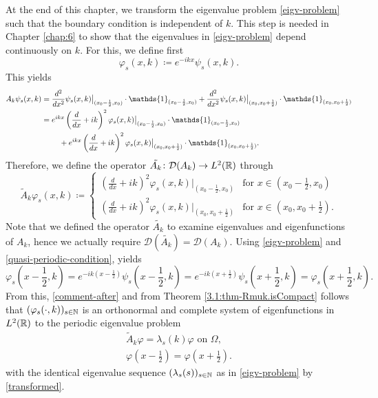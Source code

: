 At the end of this chapter, we transform the eigenvalue problem \eqref{eigv-problem} such that the boundary condition is independent of $k$. This step is needed in Chapter \ref{chap:6} to show that the eigenvalues in \ref{eigv-problem} depend continuously on $k$. For this, we define first
	\[ \varphi_{s}(x, k) \coloneqq e^{-ikx} \psi_{s}(x, k). \]
This yields
	\begin{align}
		A_{k} \psi_{s}(x, k) & = \frac{d^{2}}{dx^{2}} \psi_{s}(x, k)\big|_{(x_{0} - \frac{1}{2}, x_{0})} \cdot \mathds{1}_{(x_{0} - \frac{1}{2}, x_{0})} + \frac{d^{2}}{dx^{2}} \psi_{s}(x, k)\big|_{(x_{0}, x_{0}  + \frac{1}{2})} \cdot \mathds{1}_{(x_{0}, x_{0} + \frac{1}{2})} \notag \\
			& = e^{ikx} \left( \frac{d}{dx} + ik \right)^{2} \varphi_{s}(x, k)\big|_{(x_{0} - \frac{1}{2}, x_{0})} \cdot \mathds{1}_{(x_{0} - \frac{1}{2}, x_{0})} \notag \\
			& ~\qquad + e^{ikx} \left( \frac{d}{dx} + ik \right)^{2} \varphi_{s}(x, k)\big|_{(x_{0}, x_{0}  + \frac{1}{2})} \cdot \mathds{1}_{(x_{0}, x_{0} + \frac{1}{2})}. \label{transformed}
	\end{align}
Therefore, we define the operator $\tilde{A_{k}} \colon \mathcal{D}(A_{k}) \rightarrow L^{2}(\mathbb{R})$ through 
	\[ \tilde{A}_{k} \varphi_{s}(x, k) \coloneqq \begin{cases}
		\left( \frac{d}{dx} + ik \right)^{2} \varphi_{s}(x, k)|_{(x_{0} - \frac{1}{2}, x_{0})} & \text{for } x \in (x_{0} - \frac{1}{2}, x_{0}) \\ \left( \frac{d}{dx} + ik \right)^{2} \varphi_{s}(x, k)|_{(x_{0}, x_{0}  + \frac{1}{2})} & \text{for } x \in (x_{0}, x_{0} + \frac{1}{2}).
	\end{cases} \] 
Note that we defined the operator $\tilde{A_{k}}$ to examine eigenvalues and eigenfunctions of $A_{k}$, hence we actually require $\mathcal{D}(\tilde{A_{k}}) = \mathcal{D}(A_{k})$. Using \eqref{eigv-problem} and \eqref{quasi-periodic-condition}, yields
	\[ \varphi_{s}\left(x - \frac{1}{2}, k\right) = e^{-ik(x - \frac{1}{2})} \psi_{s}\left(x - \frac{1}{2}, k\right) = e^{-ik(x + \frac{1}{2})} \psi_{s}\left(x + \frac{1}{2}, k\right) = \varphi_{s}\left(x + \frac{1}{2}, k\right). \]
From this, \eqref{comment-after} and from Theorem \ref{3.1:thm-Rmuk.isCompact} follows that $(\varphi_{s}(\cdot, k))_{s \in \mathbb{N}}$ is an orthonormal and complete system of eigenfunctions in $L^{2}(\mathbb{R})$ to the periodic eigenvalue problem
	\begin{align}
		\tilde{A}_{k} \varphi = \lambda_{s}(k) \varphi \text{ on } \Omega, \label{mod-eigv-problem} \\
		\varphi\left(x - \frac{1}{2}\right) = \varphi\left(x + \frac{1}{2}\right). \label{periodic-condition}
	\end{align}
with the identical eigenvalue sequence $(\lambda_{s}(s))_{s \in \mathbb{N}}$ as in \eqref{eigv-problem} by \eqref{transformed}.